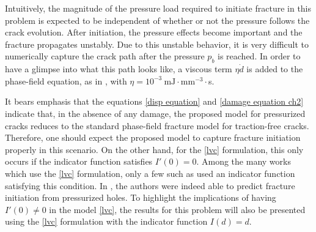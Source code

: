 

Intuitively, the magnitude of the pressure load required to initiate fracture in this problem is expected to be independent of whether or not the pressure follows the crack evolution. After initiation, the pressure effects become important and the fracture propagates unstably. Due to this unstable behavior, it is very difficult to numerically capture the crack path after the pressure $p_b$ is reached. In order to have a glimpse into what this path looks like, a viscous term $\eta \dot d$ is added to the phase-field equation, as in \cite{miehe2010phase}, with $\eta = 10^{-3}\  \text{mJ}\cdot\text{mm}^{-3}\cdot$s. 

It bears emphasis that the equations \eqref{disp equation} and \eqref{damage equation ch2} indicate that, in the absence of any damage, the proposed model for pressurized cracks reduces to the standard phase-field fracture model for traction-free cracks. Therefore, one should expect the proposed model to capture fracture initiation properly in this scenario. On the other hand, for the \eqref{lvc} formulation, this only occurs if the indicator function satisfies $I'(0) = 0$. Among the many works which use the \eqref{lvc} formulation, only a few such as \cite{jiang2022phase, peco2017influence} used an indicator function satisfying this condition. In \cite{jiang2022phase}, the authors were indeed able to predict fracture initiation from pressurized holes. To highlight the implications of having $I'(0) \neq 0$ in the model \eqref{lvc}, the results for this problem will also be presented using the  \eqref{lvc} formulation with the indicator function $I(d) = d$.



